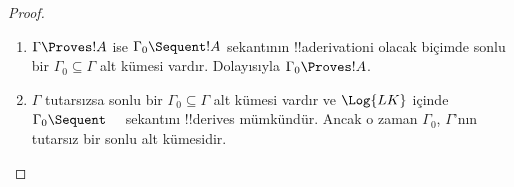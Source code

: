 \documentclass[../../../include/open-logic-section]{subfiles}
\begin{document}
\begin{proof}
  \begin{enumerate}
    \item $\Gamma \Proves !A$ ise $\Gamma_0 \Sequent !A$ sekantının
      !!a{derivation}{}i olacak biçimde sonlu bir $\Gamma_0\subseteq\Gamma$
      alt kümesi vardır. Dolayısıyla $\Gamma_0\Proves !A$.
    \item $\Gamma$ tutarsızsa sonlu bir $\Gamma_0\subseteq\Gamma$ alt
      kümesi vardır ve $\Log{LK}$ içinde $\Gamma_0\Sequent\quad$ sekantını
      !!{derive}s mümkündür. Ancak o zaman $\Gamma_0$, $\Gamma$'nın tutarsız bir
      sonlu alt kümesidir.
  \end{enumerate}
\end{proof}
\end{document}

